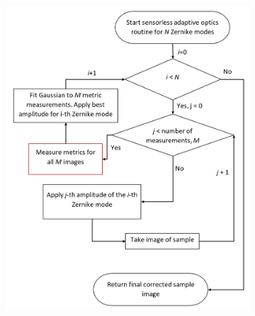 \begin{figure}[h]
\begin{subfigure}{0.425\textwidth}
		\includegraphics[scale=0.55]{./images/sensorless_correction_workflow_2.jpg}
		\caption{}
		\label{fig:sensorless_correction_workflow_2}
	\end{subfigure}
	

\end{figure}
